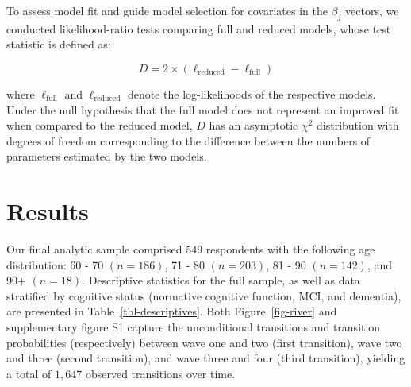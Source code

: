 \documentclass[
]{article}
\begin{document}
To assess model fit and guide model selection for covariates in the
\(\beta_j\) vectors, we conducted likelihood-ratio tests comparing full
and reduced models, whose test statistic is defined as:

\[ D = 2 \times (\ell_{\text{reduced}} - \ell_{\text{full}}) \]

where \(\ell_{\text{full}}\) and \(\ell_{\text{reduced}}\) denote the
log-likelihoods of the respective models. Under the null hypothesis that
the full model does not represent an improved fit when compared to the
reduced model, \(D\) has an asymptotic \(\chi^2\) distribution with
degrees of freedom corresponding to the difference between the numbers
of parameters estimated by the two models.

\section{Results}\label{results}

Our final analytic sample comprised \(549\) respondents with the
following age distribution: 60 - 70 \((n = 186)\), 71 - 80
\((n = 203)\), 81 - 90 \((n = 142)\), and 90+ \((n = 18)\). Descriptive
statistics for the full sample, as well as data stratified by cognitive
status (normative cognitive function, MCI, and dementia), are presented
in Table~\ref{tbl-descriptives}. Both Figure~\ref{fig-river} and
supplementary figure S1 capture the unconditional transitions and
transition probabilities (respectively) between wave one and two (first
transition), wave two and three (second transition), and wave three and
four (third transition), yielding a total of \(1,647\) observed
transitions over time.
\end{document}
